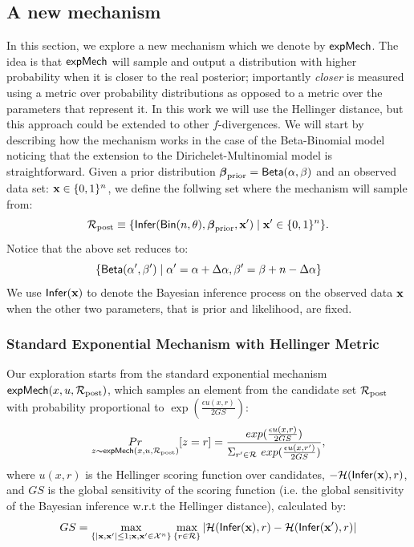 \documentclass{article}
\begin{document}
\subsection{A new mechanism}
In this section, we explore a new mechanism which we denote by $\mathsf{expMech}$.
The idea is that $\mathsf{expMech}$ will sample and output a distribution with higher probability when
it is closer to the real posterior; importantly  \emph{closer} is measured using a metric over probability
distributions as opposed to a metric over the parameters that represent it. In this work we will
use the Hellinger distance, but this approach could be extended to other $f$-divergences. We will
start by describing how the mechanism works in the case of the Beta-Binomial model noticing that
the extension to the Dirichelet-Multinomial model is straightforward.
Given a prior distribution $\boldsymbol{\beta}_{\textup{prior}}=\mathsf{Beta}(\alpha, \beta)$ and an observed data set: $\textbf{x}\in\{0,1\}^n$,
we define the follwing set  where the mechanism will sample from:
\[
  \mathcal{R}_{\textup{post}}\equiv\{\mathsf{Infer}(\mathsf{Bin}(n, \theta), \boldsymbol{\beta}_{\textup{prior}},\textbf{x}')\mid \textbf{x}' \in \{0,1\}^n\}.
\]
Notice that the above set reduces to:
\[
  \{\mathsf{Beta}(\alpha',\beta')\mid \alpha'=\alpha + \Delta\alpha, \beta'=\beta + n-\Delta\alpha\}
\]
We use $\mathsf{Infer}(\textbf{x})$ to denote the Bayesian inference process on the observed data $\textbf{x}$
when the other two parameters, that is prior and likelihood, are fixed. 

\subsubsection{Standard Exponential Mechanism with Hellinger Metric}
Our exploration starts from the standard exponential mechanism $\mathsf{expMech}(x,u,\mathcal{R}_{\textup{post}})$, which samples an element from the candidate set $\mathcal{R}_{\textup{post}}$ with probability proportional to $\exp(\frac{\epsilon u(x,r)}{2 GS})$:
\[
\underset{z \thicksim \mathsf{expMech}(x,u,\mathcal{R}_{\textup{post}}) }{Pr}[z=r] = \frac
{exp(\frac{\epsilon u(x,r)}{2 GS})}
{\Sigma_{r' \in \mathcal{R}}\ exp(\frac{\epsilon u(x,r')}{2 GS})},
\]
where $u(x,r)$ is the Hellinger scoring function over candidates, $-\mathcal{H}(\mathsf{Infer}(\textbf{x}), r)$, and $GS$ is the global sensitivity of the scoring function (i.e. the global sensitivity of the Bayesian inference w.r.t the Hellinger distance), calculated by:
\begin{equation*}
GS = 
\max_{\{|\textbf{x},\textbf{x}'| \leq 1;\textbf{x},\textbf{x}'\in \mathcal{X}^n\}}\max_{\{r\in \mathcal{R}\}}
|\mathcal{H}(\mathsf{Infer}(\textbf{x}), r) - \mathcal{H}(\mathsf{Infer}(\textbf{x}'), r)|
\end{equation*}
\end{document}
